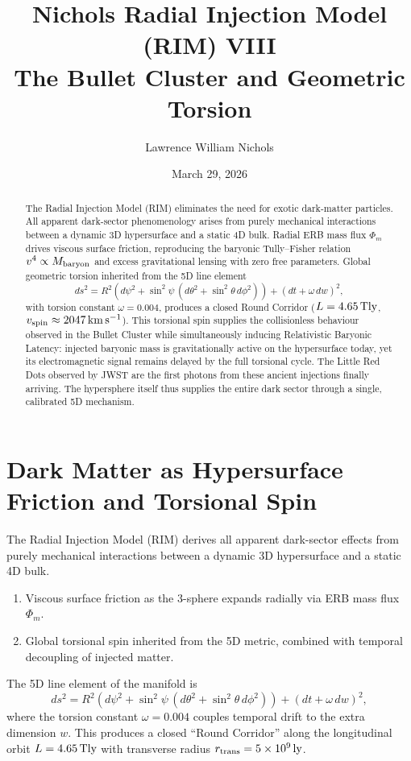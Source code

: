 \documentclass[11pt,a4paper]{article}
\title{Nichols Radial Injection Model (RIM) VIII\\The Bullet Cluster and Geometric Torsion}
\author{Lawrence William Nichols}
\date{March 29, 2026}
\begin{document}
\maketitle

\begin{abstract}
The Radial Injection Model (RIM) eliminates the need for exotic dark-matter particles. All apparent dark-sector phenomenology arises from purely mechanical interactions between a dynamic 3D hypersurface and a static 4D bulk. Radial ERB mass flux $\Phi_m$ drives viscous surface friction, reproducing the baryonic Tully–Fisher relation $v^4 \propto M_{\rm baryon}$ and excess gravitational lensing with zero free parameters. Global geometric torsion inherited from the 5D line element
\[
ds^2 = R^2 \left( d\psi^2 + \sin^2 \psi \,(d\theta^2 + \sin^2 \theta \,d\phi^2) \right) + (dt + \omega \,dw)^2,
\]
with torsion constant $\omega = 0.004$, produces a closed Round Corridor ($L = 4.65\,\rm Tly$, $v_{\rm spin} \approx 2047\,\rm km\,s^{-1}$). This torsional spin supplies the collisionless behaviour observed in the Bullet Cluster while simultaneously inducing Relativistic Baryonic Latency: injected baryonic mass is gravitationally active on the hypersurface today, yet its electromagnetic signal remains delayed by the full torsional cycle. The Little Red Dots observed by JWST are the first photons from these ancient injections finally arriving. The hypersphere itself thus supplies the entire dark sector through a single, calibrated 5D mechanism.
\end{abstract}

\section{Dark Matter as Hypersurface Friction and Torsional Spin}

The Radial Injection Model (RIM) derives all apparent dark-sector effects from purely mechanical interactions between a dynamic 3D hypersurface and a static 4D bulk.

\begin{enumerate}
    \item Viscous surface friction as the 3-sphere expands radially via ERB mass flux $\Phi_m$.
    \item Global torsional spin inherited from the 5D metric, combined with temporal decoupling of injected matter.
\end{enumerate}

The 5D line element of the manifold is
\[
ds^2 = R^2 \left( d\psi^2 + \sin^2 \psi \,(d\theta^2 + \sin^2 \theta \,d\phi^2) \right) + (dt + \omega \,dw)^2,
\]
where the torsion constant $\omega = 0.004$ couples temporal drift to the extra dimension $w$. This produces a closed ``Round Corridor'' along the longitudinal orbit $L = 4.65\,\rm Tly$ with transverse radius $r_{\rm trans} = 5 \times 10^9\,\rm ly$.
\end{document}
